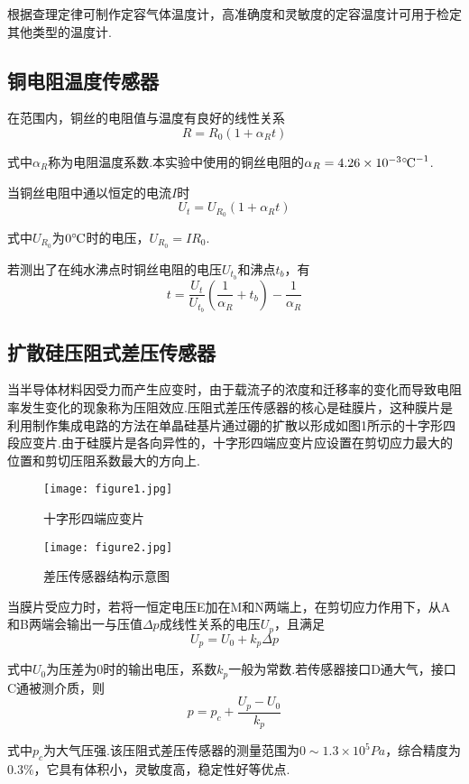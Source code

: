 \documentclass{thureport}
\def\celsius{{\ensuremath{^\circ\hspace{-0.09em}\mathrm{C}}}}
\begin{document}
根据查理定律可制作定容气体温度计，高准确度和灵敏度的定容温度计可用于检定其他类型的温度计.

\subsection{铜电阻温度传感器}
在范围内，铜丝的电阻值与温度有良好的线性关系
$$R=R_0(1+\alpha_Rt)$$

式中$\alpha_R$称为电阻温度系数.本实验中使用的铜丝电阻的$\alpha_R=4.26\times10^{-3}\celsius^{-1}$.

当铜丝电阻中通以恒定的电流$I$时
$$U_t=U_{R_0}(1+\alpha_Rt)$$

式中$U_{R_0}$为$0\celsius$时的电压，$U_{R_0}=IR_0$.

若测出了在纯水沸点时铜丝电阻的电压$U_{t_b}$和沸点$t_b$，有
$$t=\frac{U_t}{U_{t_b}}(\frac{1}{\alpha_R}+t_b)-\frac{1}{\alpha_R}$$

\subsection{扩散硅压阻式差压传感器}
当半导体材料因受力而产生应变时，由于载流子的浓度和迁移率的变化而导致电阻率发生变化的现象称为压阻效应.压阻式差压传感器的核心是硅膜片，这种膜片是利用制作集成电路的方法在单晶硅基片通过硼的扩散以形成如图1所示的十字形四段应变片.由于硅膜片是各向异性的，十字形四端应变片应设置在剪切应力最大的位置和剪切压阻系数最大的方向上.

\begin{figure}[h]
	\begin{minipage}[t]{0.4\linewidth}
		\centering
		\texttt{[image: figure1.jpg]}
		\caption{十字形四端应变片}
	\end{minipage}
	\hfill
	\begin{minipage}[t]{0.5\linewidth}
		\centering
		\texttt{[image: figure2.jpg]}
		\caption{差压传感器结构示意图}
	\end{minipage}
\end{figure}

当膜片受应力时，若将一恒定电压E加在M和N两端上，在剪切应力作用下，从A和B两端会输出一与压值$\Delta p$成线性关系的电压$U_p$，且满足
$$U_p=U_0+k_p\Delta p$$

式中$U_0$为压差为0时的输出电压，系数$k_p$一般为常数.若传感器接口D通大气，接口C通被测介质，则
$$p=p_c+\frac{U_p-U_0}{k_p}$$

式中$p_c$为大气压强.该压阻式差压传感器的测量范围为$0\sim1.3\times10^5 Pa$，综合精度为$0.3\%$，它具有体积小，灵敏度高，稳定性好等优点.
\end{document}
